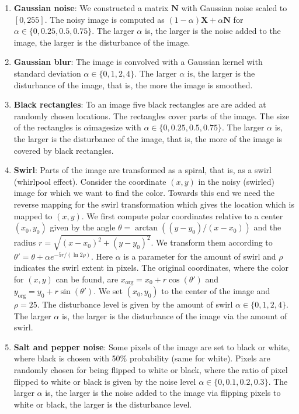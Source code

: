 \documentclass{article}
\newcommand\BN{\bm{N}}
\newcommand\BX{\bm{X}}
\begin{document}
\begin{enumerate}
\item {\bf Gaussian noise}: We constructed a matrix $\BN$ with Gaussian
noise scaled to $[0,255]$. The noisy image is computed as
$(1-\alpha) \BX + \alpha \BN$ for $\alpha \in \{0,0.25,0.5,0.75\}$.
The larger $\alpha$ is, the larger is the noise added to the image,
the larger is the disturbance of the image.

\item {\bf Gaussian blur}: The image is convolved with a Gaussian
kernel with standard deviation $\alpha \in \{0,1,2,4\}$.
The larger $\alpha$ is, the larger is the disturbance of the image, that is,
the more the image is smoothed.

\item {\bf Black rectangles}: To an image five black rectangles are
are added at randomly chosen locations.
The rectangles cover parts of the image. The size of the rectangles
is $\alpha \text{imagesize}$ with  $\alpha \in \{0,0.25,0.5,0.75\}$.
The larger $\alpha$ is, the larger is the disturbance of the image,
that is, the more of the image is covered by black rectangles.

\item {\bf Swirl}: Parts of the image are transformed as a
spiral, that is, as a swirl (whirlpool effect).
Consider the coordinate $(x, y)$ in the noisy (swirled) image for
which we want to find the color. Towards this end we need the
reverse mapping for the swirl transformation which gives the location
which is mapped to $(x, y)$.
We first compute polar coordinates
relative to a center $(x_0, y_0)$ given by the angle
$\theta = \arctan((y - y_0)/(x - x_0))$ and the radius
$r = \sqrt{(x - x_0)^2 + (y - y_0)^2}$.
We transform them according to
$\theta' = \theta + \alpha e^{-5 r / (\ln2 \rho) }$.
Here $\alpha$ is a parameter for the amount of swirl and
$\rho$ indicates the swirl extent in pixels.
The original coordinates, where the color for $(x, y)$ can be found,
are
$x_{\mathrm{org}}=x_0 + r \cos(\theta')$ and
$y_{\mathrm{org}}=y_0 + r \sin(\theta')$.
We set $(x_0, y_0)$ to
the center of the image and $\rho=25$.
The disturbance level is given by the amount of swirl
$\alpha \in \{0,1,2,4\}$.
The larger $\alpha$ is, the larger is the disturbance of the image via the
amount of swirl.


\item {\bf Salt and pepper noise}:
Some pixels of the image are set to black or white, where black is
chosen with 50\% probability (same for white). Pixels are randomly
chosen for being flipped to white or black, where the ratio of pixel
flipped to white or black is given by the noise level
$\alpha \in \{0,0.1,0.2,0.3\}$.
The larger $\alpha$ is, the larger is the noise added to the image
via flipping pixels to white or black, the larger is the disturbance level.


\end{enumerate}
\end{document}
